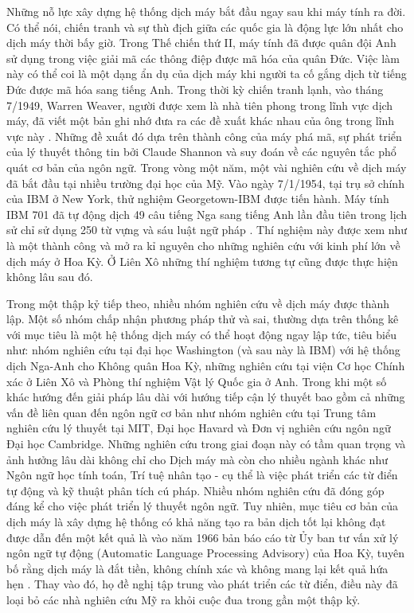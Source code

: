 Những nỗ lực xây dựng hệ thống dịch máy bắt đầu ngay sau khi máy tính ra đời. Có thể nói, chiến tranh và sự thù địch giữa các quốc gia là động lực lớn nhất cho dịch máy thời bấy giờ. Trong Thế chiến thứ II, máy tính đã được quân đội Anh sử dụng trong việc giải mã các thông điệp được mã hóa của quân Đức. Việc làm này có thể coi là một dạng ẩn dụ của dịch máy khi người ta cố gắng dịch từ tiếng Đức được mã hóa sang tiếng Anh. Trong thời kỳ chiến tranh lạnh, vào tháng 7/1949, Warren Weaver, người được xem là nhà tiên phong trong lĩnh vực dịch máy, đã viết một bản ghi nhớ đưa ra các đề xuất khác nhau của ông trong lĩnh vực này \cite{hutchins}. Những đề xuất đó dựa trên thành công của máy phá mã, sự phát triển của lý thuyết thông tin bởi Claude Shannon và suy đoán về các nguyên tắc phổ quát cơ bản của ngôn ngữ. Trong vòng một năm, một vài nghiên cứu về dịch máy đã bắt đầu tại nhiều trường đại học của Mỹ. Vào ngày 7/1/1954, tại trụ sở chính của IBM ở New York, thử nghiệm Georgetown-IBM được tiến hành. Máy tính IBM 701 đã tự động dịch 49 câu tiếng Nga sang tiếng Anh lần đầu tiên trong lịch sử chỉ sử dụng 250 từ vựng và sáu luật ngữ pháp \cite{hutchins}. Thí nghiệm này được xem như là một thành công và mở ra kỉ nguyên cho những nghiên cứu với kinh phí lớn về dịch máy ở Hoa Kỳ. Ở Liên Xô những thí nghiệm tương tự cũng được thực hiện không lâu sau đó.

Trong một thập kỷ tiếp theo, nhiều nhóm nghiên cứu về dịch máy được thành lập. Một số nhóm chấp nhận phương pháp thử và sai, thường dựa trên thống kê với mục tiêu là một hệ thống dịch máy có thể hoạt động ngay lập tức, tiêu biểu như: nhóm nghiên cứu tại đại học Washington (và sau này là IBM) với hệ thống dịch Nga-Anh cho Không quân Hoa Kỳ, những nghiên cứu tại viện Cơ học Chính xác ở Liên Xô và Phòng thí nghiệm Vật lý Quốc gia ở Anh. Trong khi một số khác hướng đến giải pháp lâu dài với hướng tiếp cận lý thuyết bao gồm cả những vấn đề liên quan đến ngôn ngữ cơ bản như nhóm nghiên cứu tại Trung tâm nghiên cứu lý thuyết tại MIT, Đại học Havard và Đơn vị nghiên cứu ngôn ngữ Đại học Cambridge. Những nghiên cứu trong giai đoạn này có tầm quan trọng và ảnh hưởng lâu dài không chỉ cho Dịch máy mà còn cho nhiều ngành khác như Ngôn ngữ học tính toán, Trí tuệ nhân tạo - cụ thể là việc phát triển các từ điển tự động và kỹ thuật phân tích cú pháp. Nhiều nhóm nghiên cứu đã đóng góp đáng kể cho việc phát triển lý thuyết ngôn ngữ. Tuy nhiên, mục tiêu cơ bản của dịch máy là xây dựng hệ thống có khả năng tạo ra bản dịch tốt lại không đạt được dẫn đến một kết quả là vào năm 1966 bản báo cáo từ Ủy ban tư vấn xử lý ngôn ngữ tự động (Automatic Language Processing Advisory) của Hoa Kỳ, tuyên bố rằng dịch máy là đắt tiền, không chính xác và không mang lại kết quả hứa hẹn \cite{hutchins}. Thay vào đó, họ đề nghị tập trung vào phát triển các từ điển, điều này đã loại bỏ các nhà nghiên cứu Mỹ ra khỏi cuộc đua trong gần một thập kỷ.


